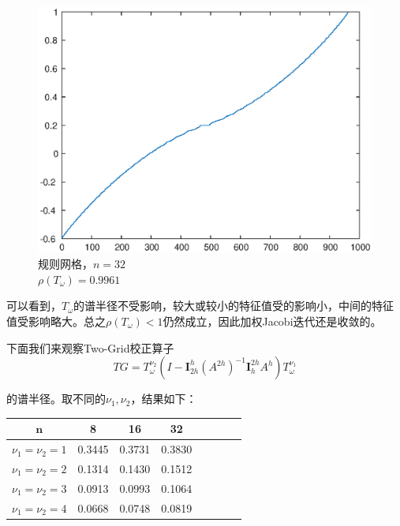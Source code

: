 \documentclass[lang=cn,10pt]{elegantbook}
\begin{document}
\begin{figure}[H]
\begin{minipage}[t]{0.28\linewidth}
    \includegraphics[width=0.9\linewidth]{figure/3-t-6.eps}
    \caption*{\small 规则网格，$n=32$ \\ $\rho(T_\omega)=0.9961$}
  \end{minipage}
\end{figure}

可以看到，$T_\omega$的谱半径不受影响，较大或较小的特征值受的影响小，中间的特征值受影响略大。总之$\rho(T_\omega)<1$仍然成立，因此加权Jacobi迭代还是收敛的。

下面我们来观察Two-Grid校正算子
\begin{equation}
  TG=T_\omega^{\nu_2}(I-\mathbf{I}_{2h}^h(A^{2h})^{-1}\mathbf{I}_h^{2h}A^h)T_\omega^{\nu_1}
\end{equation}

的谱半径。取不同的$\nu_1,\nu_2$，结果如下：

\begin{table}[H]
  \centering
  \small
  \begin{tabular}{c|ccccccc}
   $\mathbf{n}$      & 8                   & 16                   & 32                       \\ \hline
   $\nu_1=\nu_2=1$   & 0.3445              & 0.3731               & 0.3830  \\
   $\nu_1=\nu_2=2$   & 0.1314              & 0.1430               & 0.1512  \\
   $\nu_1=\nu_2=3$   & 0.0913              & 0.0993               & 0.1064  \\
   $\nu_1=\nu_2=4$   & 0.0668              & 0.0748               & 0.0819  \\
\end{tabular}
\end{table}
\end{document}
